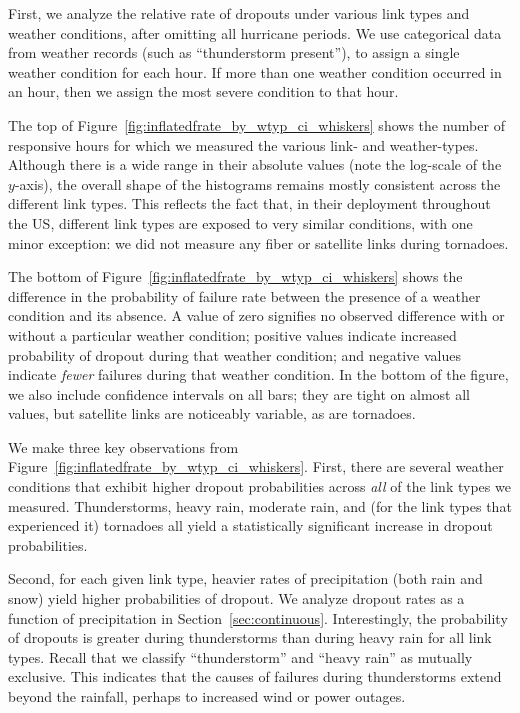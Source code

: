 
First, we analyze the relative rate of dropouts under various link types
and weather conditions, after omitting all hurricane periods.
%
We use categorical data from 
weather records (such as ``thunderstorm present''),  to assign a
single weather condition for each hour. 
% 
If more than one weather condition occurred in an hour, then we assign
the most severe condition to that hour.
% 

%
The top of Figure~\ref{fig:inflatedfrate_by_wtyp_ci_whiskers} shows the
number of responsive hours for which we measured the various link- and
weather-types.
%
Although there is a wide range in their absolute values (note the
log-scale of the $y$-axis), the overall shape of the histograms remains
mostly consistent across the different link types.
%
This reflects the fact that, in their deployment throughout the US,
different link types are exposed to very similar conditions, with one
minor exception: we did not measure any fiber or satellite links during
tornadoes.


The bottom of Figure~\ref{fig:inflatedfrate_by_wtyp_ci_whiskers} shows
the difference in the probability of failure rate between the presence
of a weather condition and its absence.
%
A value of zero signifies no observed difference with or without a
particular weather condition; positive values indicate increased
probability of dropout during that weather condition; and negative
values indicate \emph{fewer} failures during that weather condition.
%
In the bottom of the figure, we also include confidence intervals on
all bars; they are tight on almost all values, but satellite links are
noticeably variable, as are tornadoes.


We make three key observations from
Figure~\ref{fig:inflatedfrate_by_wtyp_ci_whiskers}.
%
First, there are several weather conditions that exhibit higher dropout
probabilities across \emph{all} of the link types we measured.
%
Thunderstorms, heavy rain, moderate rain, and (for the link types that
experienced it) tornadoes all yield a statistically significant
increase in dropout probabilities.


Second, for each given link type, heavier rates of precipitation (both
rain and snow) yield higher probabilities of dropout.
%
We analyze dropout rates as a function of precipitation in
Section~\ref{sec:continuous}.
%
Interestingly, the probability of dropouts is greater during
thunderstorms than during heavy rain for all link types.
%
Recall that we classify ``thunderstorm'' and ``heavy rain'' as mutually
exclusive.
%
This indicates that the causes of failures during thunderstorms extend
beyond the rainfall, perhaps to increased wind or power outages.
%


